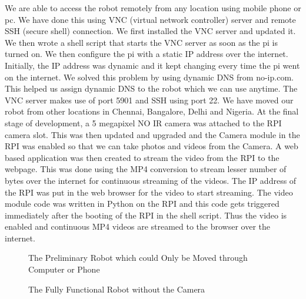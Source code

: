We are able to access the robot remotely from any location using mobile phone or pc. We have done this using VNC (virtual network controller) server and remote SSH (secure shell) connection. We first installed the VNC server and updated it. We then wrote a shell script that starts the VNC server as soon as the pi is turned on. We then configure the pi with a static IP address over the internet. Initially, the IP address was dynamic and it kept changing every time the pi went on the internet. We solved this problem by using dynamic DNS from no-ip.com. This helped us assign dynamic DNS to the robot which we can use anytime. The VNC server makes use of port 5901 and SSH using port 22. We have moved our robot from other locations in Chennai, Bangalore, Delhi and Nigeria. 
At the final stage of development, a 5 megapixel NO IR camera was attached to the RPI camera slot. This was then updated and upgraded and the Camera module in the RPI was enabled so that we can take photos and videos from the Camera. A web based application was then created to stream the video from the RPI to the webpage. This was done using the MP4 conversion to stream lesser number of bytes over the internet for continuous streaming of the videos. The IP address of the RPI was put in the web browser for the video to start streaming. The video module code was written in Python on the RPI and this code gets triggered immediately after the booting of the RPI in the shell script. Thus the video is enabled and continuous MP4 videos are streamed to the browser over the internet.


\begin{figure}[H]
  \centering
  \caption{The Preliminary Robot which could Only be Moved through Computer or Phone}
  \label{first robot}	
\end{figure}

\begin{figure}[H]
  \centering
  \caption{The Fully Functional Robot without the Camera}
  \label{second robot}	
\end{figure}



